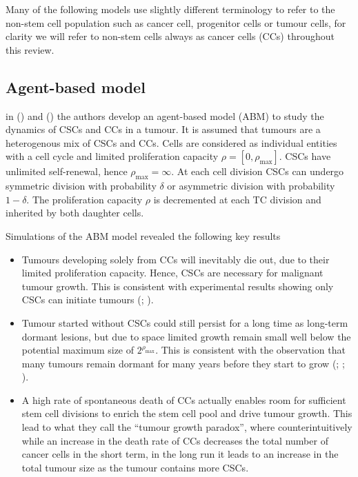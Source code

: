 \documentclass[
  letterpaper,
]{scrreprt}
\providecommand{\tightlist}{%
  \setlength{\itemsep}{0pt}\setlength{\parskip}{0pt}}\usepackage{longtable,booktabs,array}
\theoremstyle{definition}
\theoremstyle{remark}
\begin{document}
Many of the following models use slightly different terminology to refer
to the non-stem cell population such as cancer cell, progenitor cells or
tumour cells, for clarity we will refer to non-stem cells always as
cancer cells (CCs) throughout this review.

\subsection{Agent-based model}\label{sec-agent-based-model}

in () and
() the authors develop an
agent-based model (ABM) to study the dynamics of CSCs and CCs in a
tumour. It is assumed that tumours are a heterogenous mix of CSCs and
CCs. Cells are considered as individual entities with a cell cycle and
limited proliferation capacity \(\rho = [0,\rho_\text{max}]\). CSCs have
unlimited self-renewal, hence \(\rho_\text{max} = \infty\). At each cell
division CSCs can undergo symmetric division with probability \(\delta\)
or asymmetric division with probability \(1-\delta\). The proliferation
capacity \(\rho\) is decremented at each TC division and inherited by
both daughter cells.

Simulations of the ABM model revealed the following key results

\begin{itemize}
\tightlist
\item
  Tumours developing solely from CCs will inevitably die out, due to
  their limited proliferation capacity. Hence, CSCs are necessary for
  malignant tumour growth. This is consistent with experimental results
  showing only CSCs can initiate tumours
  (;
  ).
\item
  Tumour started without CSCs could still persist for a long time as
  long-term dormant lesions, but due to space limited growth remain
  small well below the potential maximum size of
  \(2^{\rho_\text{max}}\). This is consistent with the observation that
  many tumours remain dormant for many years before they start to grow
  (;
  ;
  ).
\item
  A high rate of spontaneous death of CCs actually enables room for
  sufficient stem cell divisions to enrich the stem cell pool and drive
  tumour growth. This lead to what they call the ``tumour growth
  paradox'', where counterintuitively while an increase in the death
  rate of CCs decreases the total number of cancer cells in the short
  term, in the long run it leads to an increase in the total tumour size
  as the tumour contains more CSCs.
\end{itemize}
\end{document}
